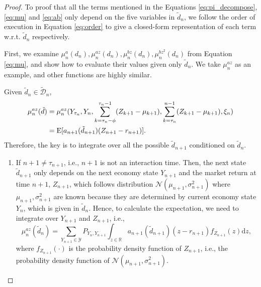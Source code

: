 \begin{proof} To proof that all the terms mentioned in the Equations \eqref{eq:pi_decompose}, \eqref{eq:mu} and \eqref{eq:ab} only depend on the five variables in $\tilde d_n$, we follow the order of execution in Equation \eqref{eq:order} to give a closed-form representation of each term w.r.t. $\tilde d_n$ respectively.

First, we examine $\mu_n^{a}(d_n),\mu_n^{az}(d_n),\mu_n^{bz}(d_n),\mu_n^{bz^2}(d_n)$ from Equation \eqref{eq:mu}, and show how to evaluate their values given only $\tilde d_n$. We take $\mu_n^{az}$ as an example, and other functions are highly similar.

Given $\tilde d_n\in\tilde{\mathcal{D}}_n$,
$$\begin{aligned}
\mu_n^{az}(\tilde d)&=\mu_n^{az}(Y_{\tau_n}, Y_n,\sum_{k=\tau_n-\phi}^{\tau_n-1}(Z_{k+1}-\mu_{k+1}),\sum_{k=\tau_n}^{n-1}(Z_{k+1}-\mu_{k+1}),\xi_n)\\
&=\mathrm{E}[a_{n+1}(\tilde d_{n+1})(Z_{n+1}-r_{n+1})].
\end{aligned}$$
Therefore, the key is to integrate over all the possible $\tilde d_{n+1}$ conditioned on $\tilde d_n$.
\begin{enumerate}
    \item If $n+1\neq\tau_{n+1}$, i.e., $n+1$ is not an interaction time. Then, the next state $\tilde d_{n+1}$ only depends on the next economy state $Y_{n+1}$ and the market return at time $n+1$, $Z_{n+1}$, which follows distribution $\mathcal{N}(\mu_{n+1},\sigma^2_{n+1})$ where $\mu_{n+1},\sigma^2_{n+1}$ are known because they are determined by current economy state $Y_n$, which is given in $\tilde d_n$. Hence, to calculate the expectation, we need to integrate over $Y_{n+1}$ and $Z_{n+1}$, i.e., \begin{equation}\label{eq:not_inter}
        \mu_{n}^{az}(\tilde d_n)=\sum_{Y_{n+1}\in\mathcal Y}P_{Y_{n},Y_{n+1}} \int_{z\in\mathbb{R}} {a_{n+1}(\tilde d_{n+1})}(z-r_{n+1})f_{Z_{n+1}}(z)\mathrm{d}z,
    \end{equation} where $f_{Z_{n+1}}(\cdot)$ is the probability density function of $Z_{n+1}$, i.e., the probability density function of $\mathcal N(\mu_{n+1},\sigma_{n+1}^2)$.


\end{enumerate}
\end{proof}
